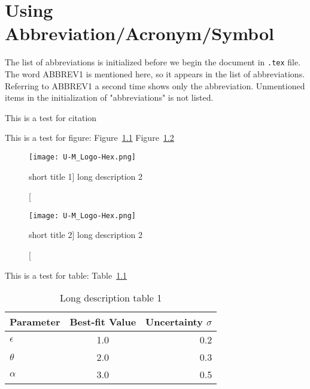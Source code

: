 \chapter{Using Abbreviation/Acronym/Symbol}
The list of abbreviations is initialized before we begin the document in 
\texttt{.tex} file. The word \ac{ABBREV1} is mentioned here, so it appears 
in the list of abbreviations. Referring to \ac{ABBREV1} a second time shows 
only the abbreviation. Unmentioned items in the initialization of "abbreviations" 
is not listed. 

This is a test for citation~\cite{Knuth:1986:TEX:1102013}

This is a test for figure: Figure~\ref{fig:testfig1} Figure~\ref{fig:testfig2}
\begin{figure}[h!]
    \centering
    \texttt{[image: U-M\_Logo-Hex.png]}
    \caption
        [short title 1] %
        {long description 2} %
    \label{fig:testfig1}
\end{figure}
\begin{figure}[h!]
    \centering
    \texttt{[image: U-M\_Logo-Hex.png]}
    \caption
        [short title 2] %
        {long description 2} %
    \label{fig:testfig2}
\end{figure}

This is a test for table: Table~\ref{table:tab1}

\begin{table}[b!]
    \begin{center}
        \caption[Table 1]{Long description table 1}
        \begin{tabular}{l|cr}
            \hline \hline
            Parameter & Best-fit Value & Uncertainty $\sigma$\\
            \hline
            $\epsilon$ & 1.0 & 0.2 \\
            $\theta$ & 2.0 & 0.3 \\
            $\alpha$ & 3.0 & 0.5 \\
            \hline \hline
        \end{tabular}
        \label{table:tab1}
    \end{center}
\end{table}



